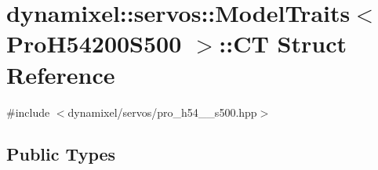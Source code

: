 \hypertarget{structdynamixel_1_1servos_1_1_model_traits_3_01_pro_h54200_s500_01_4_1_1_c_t}{}\section{dynamixel\+:\+:servos\+:\+:Model\+Traits$<$ Pro\+H54200\+S500 $>$\+:\+:CT Struct Reference}
\label{structdynamixel_1_1servos_1_1_model_traits_3_01_pro_h54200_s500_01_4_1_1_c_t}


{\ttfamily \#include $<$dynamixel/servos/pro\+\_\+h54\+\_\+\_\+s500.\+hpp$>$}

\subsection*{Public Types}
